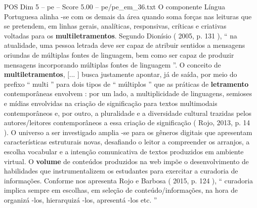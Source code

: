 \begin{textsample}{POS Dim 5 – pe – Score 5.00 – pe/pe\_em\_36.txt}
O componente Língua Portuguesa alinha -se com os demais da área quando soma forças nas leituras que se pretendem, em linhas gerais, analíticas, responsivas, críticas e criativas voltadas para os \textbf{multiletramentos}.
Segundo Dionísio ( 2005, p. 131 ), “ na atualidade, uma pessoa letrada deve ser capaz de atribuir sentidos a mensagens oriundas de múltiplas fontes de linguagem, bem como ser capaz de produzir mensagens incorporando múltiplas fontes de linguagem ”.
O conceito de \textbf{multiletramentos}, [... ] busca justamente apontar, já de saída, por meio do prefixo “ multi ” para dois tipos de “ múltiplos ” que as práticas de \textbf{letramento} contemporâneas envolvem : por um lado, a multiplicidade de linguagens, semioses e mídias envolvidas na criação de significação para textos multimodais contemporâneos e, por outro, a pluralidade e a diversidade cultural trazidas pelos autores/leitores contemporâneos a essa criação de significação ( Rojo, 2013, p. 14 ).
O universo a ser investigado amplia -se para os gêneros digitais que apresentam características estruturais novas, desafiando o leitor a compreender os arranjos, a escolha vocabular e a intenção comunicativa de textos produzidos em ambiente virtual.
O \textbf{volume} de conteúdos produzidos na web impõe o desenvolvimento de habilidades que instrumentalizem os estudantes para exercitar a curadoria de informações.
Conforme nos apresenta Rojo e Barbosa ( 2015, p. 124 ), “ curadoria implica sempre em escolhas, em seleção de conteúdo/informações, na hora de organizá -los, hierarquizá -los, apresentá -los etc. ”

\end{textsample}
